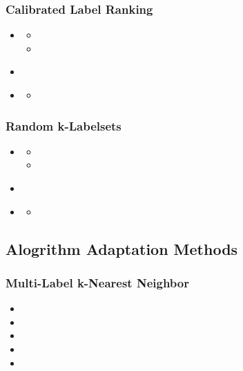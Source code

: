 \documentclass{beamer}
\begin{document}
\begin{frame}
\frametitle{Calibrated Label Ranking}
\begin{itemize}
\item <2-> 
\begin{itemize}
\item 
\item <4-> 
\end{itemize}
\end{itemize}
\begin{itemize}
\item<5-> 
\end{itemize}

\begin{itemize}
\item <7-> 
\begin{itemize}
\item <8-> 
\end{itemize}
\end{itemize}
\end{frame}
\begin{frame}
\frametitle{Random k-Labelsets}
\begin{itemize}
\item <2-> 
\begin{itemize}
\item 
\item <4-> 
\end{itemize}
\end{itemize}
\begin{itemize}
\item<5-> 
\end{itemize}

\begin{itemize}
\item <7-> 
\begin{itemize}
\item <8-> 
\end{itemize}
\end{itemize}
\end{frame}

\subsection{Alogrithm Adaptation Methods}

\begin{frame}
\frametitle{Multi-Label k-Nearest Neighbor}
\begin{itemize}
\item <2-> 
\item <3-> 
\item <4-> 
\item<5-> 
\item <6-> 
\end{itemize}
\end{frame}
\end{document}

